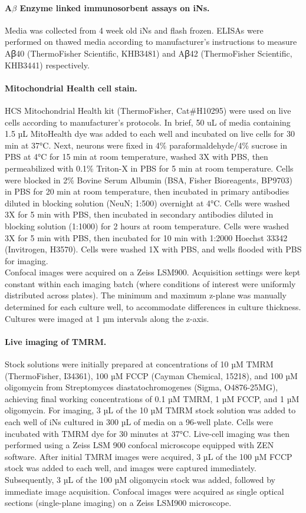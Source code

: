 \paragraph{A$\beta$ Enzyme linked immunosorbent assays on iNs.}
Media was collected from 4 week old iNs and flash frozen. ELISAs were performed on thawed media according to manufacturer’s instructions to measure Aꞵ40 (ThermoFisher Scientific, KHB3481) and Aꞵ42 (ThermoFisher Scientific, KHB3441) respectively.

\paragraph{Mitochondrial Health cell stain.}
HCS Mitochondrial Health kit (ThermoFisher, Cat\#H10295) were used on live cells according to manufacturer’s protocols. In brief, 50 uL of media containing 1.5 µL MitoHealth dye was added to each well and incubated on live cells for 30 min at 37°C. Next, neurons were fixed in 4\% paraformaldehyde/4\% sucrose in PBS at 4°C for 15 min at room temperature, washed 3X with PBS, then permeabilized with 0.1\% Triton-X in PBS for 5 min at room temperature. Cells were blocked in 2\% Bovine Serum Albumin (BSA, Fisher Bioreagents, BP9703) in PBS for 20 min at room temperature, then incubated in primary antibodies diluted in blocking solution (NeuN; 1:500) overnight at 4°C. Cells were washed 3X for 5 min with PBS, then incubated in secondary antibodies diluted in blocking solution (1:1000) for 2 hours at room temperature. Cells were washed 3X for 5 min with PBS, then incubated for 10 min with 1:2000 Hoechst 33342 (Invitrogen, H3570). Cells were washed 1X with PBS, and wells flooded with PBS for imaging.\\
Confocal images were acquired on a Zeiss LSM900. Acquisition settings were kept constant within each imaging batch (where conditions of interest were uniformly distributed across plates). The minimum and maximum z-plane was manually determined for each culture well, to accommodate differences in culture thickness. Cultures were imaged at 1 µm intervals along the z-axis.

\paragraph{Live imaging of TMRM.}
Stock solutions were initially prepared at concentrations of 10 µM TMRM (ThermoFisher, I34361), 100 µM FCCP (Cayman Chemical, 15218), and 100 µM oligomycin from Streptomyces diastatochromogenes (Sigma, O4876-25MG), achieving final working concentrations of 0.1 µM TMRM, 1 µM FCCP, and 1 µM oligomycin. For imaging, 3 µL of the 10 µM TMRM stock solution was added to each well of iNs cultured in 300 µL of media on a 96-well plate. Cells were incubated with TMRM dye for 30 minutes at 37°C. Live-cell imaging was then performed using a Zeiss LSM 900 confocal microscope equipped with ZEN software. After initial TMRM images were acquired, 3 µL of the 100 µM FCCP stock was added to each well, and images were captured immediately. Subsequently, 3 µL of the 100 µM oligomycin stock was added, followed by immediate image acquisition. Confocal images were acquired as single optical sections (single-plane imaging) on a Zeiss LSM900 microscope.

